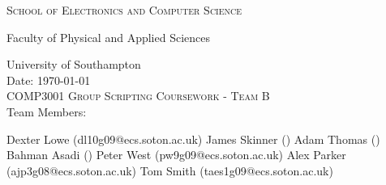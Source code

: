 \begin{titlepage}
	
\begin{center}

\textsc{\large{School of Electronics and Computer Science}}

\large{Faculty of Physical and Applied Sciences}

\large{University of Southampton}\\[3.5cm]

\large{Date: \today}\\[4.0cm]

\textsc{\LARGE COMP3001 Group Scripting Coursework - Team B}\\[4.5cm] 

\large{Team Members:}

\large{Dexter Lowe (dl10g09@ecs.soton.ac.uk)}
\large{James Skinner ()}
\large{Adam Thomas ()}
\large{Bahman Asadi ()}
\large{Peter West (pw9g09@ecs.soton.ac.uk)}
\large{Alex Parker (ajp3g08@ecs.soton.ac.uk)}
\large{Tom Smith (taes1g09@ecs.soton.ac.uk)}

\vfill

\large{}
\end{center}

\end{titlepage}
